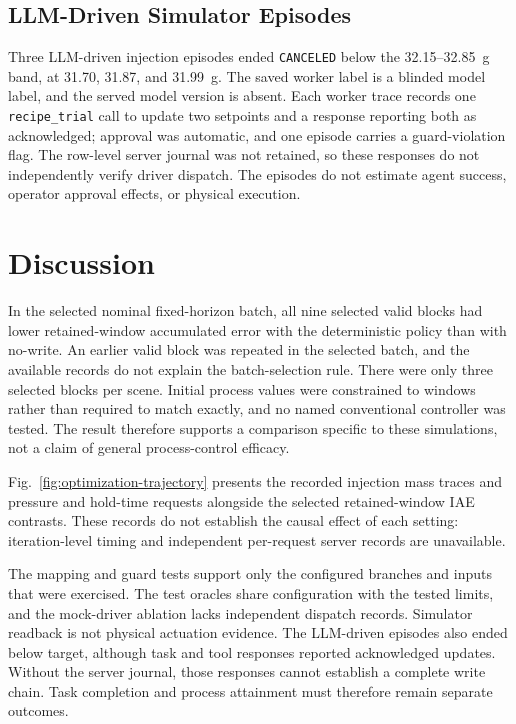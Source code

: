 \documentclass[journal]{IEEEtran}
\begin{document}
\subsection{LLM-Driven Simulator Episodes}
\label{sec:eval-agent}
Three LLM-driven injection episodes ended \texttt{CANCELED} below the 32.15--32.85~g band, at 31.70, 31.87, and 31.99~g. The saved worker label is a blinded model label, and the served model version is absent. Each worker trace records one \texttt{recipe\_trial} call to update two setpoints and a response reporting both as acknowledged; approval was automatic, and one episode carries a guard-violation flag. The row-level server journal was not retained, so these responses do not independently verify driver dispatch. The episodes do not estimate agent success, operator approval effects, or physical execution.

 \section{Discussion}
\label{sec:discussion}
In the selected nominal fixed-horizon batch, all nine selected valid blocks had lower retained-window accumulated error with the deterministic policy than with no-write. An earlier valid block was repeated in the selected batch, and the available records do not explain the batch-selection rule. There were only three selected blocks per scene. Initial process values were constrained to windows rather than required to match exactly, and no named conventional controller was tested. The result therefore supports a comparison specific to these simulations, not a claim of general process-control efficacy.

Fig.~\ref{fig:optimization-trajectory} presents the recorded injection mass traces and pressure and hold-time requests alongside the selected retained-window IAE contrasts. These records do not establish the causal effect of each setting: iteration-level timing and independent per-request server records are unavailable.

The mapping and guard tests support only the configured branches and inputs that were exercised. The test oracles share configuration with the tested limits, and the mock-driver ablation lacks independent dispatch records. Simulator readback is not physical actuation evidence. The LLM-driven episodes also ended below target, although task and tool responses reported acknowledged updates. Without the server journal, those responses cannot establish a complete write chain. Task completion and process attainment must therefore remain separate outcomes.
\end{document}
